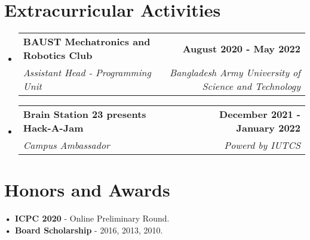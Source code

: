 \documentclass[letterpaper,11pt]{article}
\makeatletter
\newcommand{\resumeItem}[1]{
  \item\small{
    {#1 \vspace{-2pt}}
  }
}
\newcommand{\resumeSubheading}[4]{
  \vspace{-2pt}\item
    \begin{tabular*}{1.0\textwidth}[t]{l@{\extracolsep{\fill}}r}
      \textbf{#1} & \textbf{\small #2} \\
      \textit{\small#3} & \textit{\small #4} \\
    \end{tabular*}\vspace{-7pt}
}
\newcommand{\resumeSubHeadingListStart}{\begin{itemize}[leftmargin=0.0in, label={}]}
\newcommand{\resumeSubHeadingListEnd}{\end{itemize}}
\newcommand{\resumeItemListStart}{\begin{itemize}}
\newcommand{\resumeItemListEnd}{\end{itemize}\vspace{-5pt}}
\makeatother
\begin{document}
\section{Extracurricular Activities}
    \resumeSubHeadingListStart
       
             \resumeSubheading{BAUST Mechatronics and Robotics Club}{August 2020 - May 2022}{Assistant Head - Programming Unit}{Bangladesh Army University of Science and Technology}
            \resumeItemListStart
            \resumeItemListEnd
    \resumeSubheading{Brain Station 23 presents Hack-A-Jam}{December 2021 - January 2022}{Campus Ambassador}{Powerd by IUTCS}
            \resumeItemListStart
            \resumeItemListEnd
        
    \resumeSubHeadingListEnd

\section{Honors and Awards}
\resumeSubHeadingListStart
      {\textbf{• ICPC 2020} - Online Preliminary Round.\\}
      {\textbf{• Board Scholarship} - 2016, 2013, 2010.}
\resumeSubHeadingListEnd 
\end{document}
